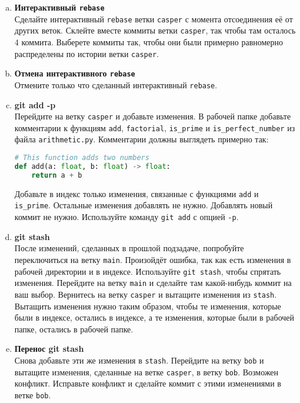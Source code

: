 \documentclass{article}
\begin{document}
\begin{enumerate}[a.]
\item \textbf{Интерактивный \texttt{rebase}}\\
Сделайте интерактивный \texttt{rebase} ветки \texttt{casper} с момента отсоединения её от других веток. Склейте вместе коммиты ветки \texttt{casper}, так чтобы там осталось 4 коммита. Выберете коммиты так, чтобы они были примерно равномерно распределены по истории ветки \texttt{casper}.

\item \textbf{Отмена интерактивного \texttt{rebase}}\\
Отмените только что сделанный интерактивный \texttt{rebase}.

\item \textbf{\textbf{git add -p}}\\
Перейдите на ветку \texttt{casper} и добавьте изменения. В рабочей папке добавьте комментарии к функциям \texttt{add}, \texttt{factorial}, \texttt{is\_prime} и \texttt{is\_perfect\_number} из файла \texttt{arithmetic.py}. Комментарии должны выглядеть примерно так:
\begin{lstlisting}[language=Python]
# This function adds two numbers
def add(a: float, b: float) -> float:
    return a + b
\end{lstlisting}

Добавьте в индекс только изменения, связанные с функциями \texttt{add} и \texttt{is\_prime}. Остальные изменения добавлять не нужно. Добавлять новый коммит не нужно. Используйте команду \texttt{git add} с опцией \texttt{-p}.

\item \textbf{\textbf{git stash}}\\
После изменений, сделанных в прошлой подзадаче, попробуйте переключиться на ветку \texttt{main}. Произойдёт ошибка, так как есть изменения в рабочей директории и в индексе. Используйте \texttt{git stash}, чтобы спрятать изменения. Перейдите на ветку \texttt{main} и сделайте там какой-нибудь коммит на ваш выбор. Вернитесь на ветку \texttt{casper} и вытащите изменения из \texttt{stash}. Вытащить изменения нужно таким образом, чтобы те изменения, которые были в индексе, остались в индексе, а те изменения, которые были в рабочей папке, остались в рабочей папке.

\item \textbf{Перенос \textbf{git stash}}\\
Снова добавьте эти же изменения в \texttt{stash}. Перейдите на ветку \texttt{bob} и вытащите изменения, сделанные на ветке \texttt{casper}, в ветку \texttt{bob}. Возможен конфликт. Исправьте конфликт и сделайте коммит с этими изменениями в ветке \texttt{bob}.


\end{enumerate}
\end{document}
